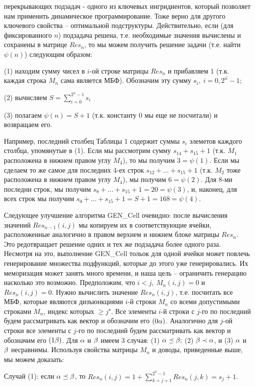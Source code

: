 перекрывающих подзадач - одного из ключевых ингридиентов, 
который позволяет нам применить динамическое программирование.
Тоже верно для другого ключевого свойства -- оптимальной подструктуры.
Действительно, если (для фиксированного $n$) подзадача решена, т.е. необходимые 
значения вычислены и сохранены в матрице $Res_n$, то мы можем получить решение
задачи (т.е. найти $\psi(n)$) следующим образом:\par
  (1) находим сумму чисел в $i$-ой строке матрицы $Res_n$ и прибавляем $1$ (т.к.
  каждая строка $M_n$ сама является МБФ). Обозначим эту сумму 
  $s_i,\ i=\overline{0, 2^n - 1}$;\par
  (2) вычисляем $S = \sum\limits_{i=0}^{2^n - 1} s_i$ \par
  (3) полагаем $\psi(n) = S + 1$ (т.к. константу $0$ мы еще не посчитали) и 
  возвращаем его.\par
Например, последний столбец Таблицы 1 содержит суммы $s_i$
элеметов каждого столбца, упомянутые в (1).
Если мы рассмотрим сумму $s_{14} + s_{15} + 1$ (т.к. $M_1$ расположена в нижнем правом
углу $M_4$), то мы получим $3 = \psi(1)$. Если мы сделаем то же самое для 
последних 4-ех строк $s_{12} + \dots + s_{15} + 1$ (т.к. $M_2$ тоже расположена
в нижнем правом углу $M_4$), мы получим $6 = \psi(2)$. 
Для 8-ми последни строк, мы получим $s_8 + \dots + s_{15} + 1 = 20 = \psi(3)$, 
и, наконец, для всех строк мы получим 
$s_0 + \dots + s_{15} + 1 = S + 1 = 168 = \psi(4)$. \par
Следующее улучшение алгоритма GEN\_Cell очевидно: 
после вычисления значений $Res_{n-1}(i, j)$ мы копируем их в соответствующие ячейки, расположенные
аналогично в правом верхнем и нижнем блоке матрицы $Res_n$. Это редотвращает решение одних и тех же 
подзадача более одного раза. Несмотря на это, выполнение GEN\_Cell тольок для одной ячейки может повлечь
генерирование множества подфункций, которые до этого уже генерировались. Их меморизация может занять много времени,
и наша цель -- ограничить генерацию насколько это возможно.
Предположим, что $i < j,\ M_n(i, j) = 0$ и $Res_n(i, j) = 0$. 
Нужно вычислить значение $Res_n(i,j)$, т.е. посчитать все МБФ, которые являются 
дизъюнкциями $i$-й строки $M_n$ со всеми
допустимыми строками $M_n$, индекс которых $\ge j$".
Все элементы $i$-й строки с $j$-го по последний будем рассматривать как вектор
и обозначим его $(0\alpha)$. Аналогично для $j$-ой строки все элементы с $j$-го по 
последний будем рассматривать как вектор
и обозначим его $(1\beta)$.
Для $\alpha$ и $\beta$ имеем 3 случая: (1) $\alpha \preceq \beta;$ (2) $\beta \prec \alpha$, 
и (3) $\alpha$ и $\beta$ несравнимы.
Используя свойства матрицы $M_n$ и доводы, приведенные выше, мы можем доказать:
\begin{Proposition}\label{Prop_alpha_preceq_beta}
 Случай (1): если $\alpha \preceq \beta$, то 
 $Res_n(i,j) = 1 + \sum\limits^{2^n-1}_{k=j+1} Res_n(j,k) = s_j + 1$. 
\end{Proposition}

